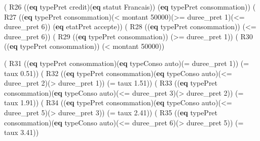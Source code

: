 \documentclass[
]{article}
\newenvironment{Shaded}{}{}
\newcommand{\DecValTok}[1]{\textcolor[rgb]{0.25,0.63,0.44}{#1}}
\newcommand{\FloatTok}[1]{\textcolor[rgb]{0.25,0.63,0.44}{#1}}
\newcommand{\KeywordTok}[1]{\textcolor[rgb]{0.00,0.44,0.13}{\textbf{#1}}}
\newcommand{\NormalTok}[1]{#1}
\newcommand{\OperatorTok}[1]{\textcolor[rgb]{0.40,0.40,0.40}{#1}}
\begin{document}
\begin{Shaded}
\begin{Highlighting}[]
\NormalTok{( R26 ((}\KeywordTok{eq}\NormalTok{ typePret credit)(}\KeywordTok{eq}\NormalTok{ statut Francais)) (}\KeywordTok{eq}\NormalTok{ typePret consommation))}
\NormalTok{( R27 ((}\KeywordTok{eq}\NormalTok{ typePret consommation)(}\OperatorTok{\textless{}}\NormalTok{ montant }\DecValTok{50000}\NormalTok{)(}\OperatorTok{\textgreater{}=}\NormalTok{ duree\_pret }\DecValTok{1}\NormalTok{)(}\OperatorTok{\textless{}=}\NormalTok{ duree\_pret }\DecValTok{6}\NormalTok{)) }
\NormalTok{        (}\KeywordTok{eq}\NormalTok{ etatPret accepte))}
\NormalTok{( R28 ((}\KeywordTok{eq}\NormalTok{ typePret consommation)) (}\OperatorTok{\textless{}=}\NormalTok{ duree\_pret }\DecValTok{6}\NormalTok{))}
\NormalTok{( R29 ((}\KeywordTok{eq}\NormalTok{ typePret consommation)) (}\OperatorTok{\textgreater{}=}\NormalTok{ duree\_pret }\DecValTok{1}\NormalTok{))}
\NormalTok{( R30 ((}\KeywordTok{eq}\NormalTok{ typePret consommation)) (}\OperatorTok{\textless{}}\NormalTok{ montant }\DecValTok{50000}\NormalTok{))}

\NormalTok{( R31 ((}\KeywordTok{eq}\NormalTok{ typePret consommation)(}\KeywordTok{eq}\NormalTok{ typeConso auto)(}\OperatorTok{=}\NormalTok{ duree\_pret }\DecValTok{1}\NormalTok{)) }
\NormalTok{    (}\OperatorTok{=}\NormalTok{ taux }\FloatTok{0.51}\NormalTok{))}
\NormalTok{( R32 ((}\KeywordTok{eq}\NormalTok{ typePret consommation)(}\KeywordTok{eq}\NormalTok{ typeConso auto)(}\OperatorTok{\textless{}=}\NormalTok{ duree\_pret }\DecValTok{2}\NormalTok{)(}\OperatorTok{\textgreater{}}\NormalTok{ duree\_pret }\DecValTok{1}\NormalTok{)) }
\NormalTok{    (}\OperatorTok{=}\NormalTok{ taux }\FloatTok{1.51}\NormalTok{))}
\NormalTok{( R33 ((}\KeywordTok{eq}\NormalTok{ typePret consommation)(}\KeywordTok{eq}\NormalTok{ typeConso auto)(}\OperatorTok{\textless{}=}\NormalTok{ duree\_pret }\DecValTok{3}\NormalTok{)(}\OperatorTok{\textgreater{}}\NormalTok{ duree\_pret }\DecValTok{2}\NormalTok{)) }
\NormalTok{    (}\OperatorTok{=}\NormalTok{ taux }\FloatTok{1.91}\NormalTok{))}
\NormalTok{( R34 ((}\KeywordTok{eq}\NormalTok{ typePret consommation)(}\KeywordTok{eq}\NormalTok{ typeConso auto)(}\OperatorTok{\textless{}=}\NormalTok{ duree\_pret }\DecValTok{5}\NormalTok{)(}\OperatorTok{\textgreater{}}\NormalTok{ duree\_pret }\DecValTok{3}\NormalTok{)) }
\NormalTok{    (}\OperatorTok{=}\NormalTok{ taux }\FloatTok{2.41}\NormalTok{))}
\NormalTok{( R35 ((}\KeywordTok{eq}\NormalTok{ typePret consommation)(}\KeywordTok{eq}\NormalTok{ typeConso auto)(}\OperatorTok{\textless{}=}\NormalTok{ duree\_pret }\DecValTok{6}\NormalTok{)(}\OperatorTok{\textgreater{}}\NormalTok{ duree\_pret }\DecValTok{5}\NormalTok{)) }
\NormalTok{    (}\OperatorTok{=}\NormalTok{ taux }\FloatTok{3.41}\NormalTok{))}


\end{Highlighting}
\end{Shaded}
\end{document}
